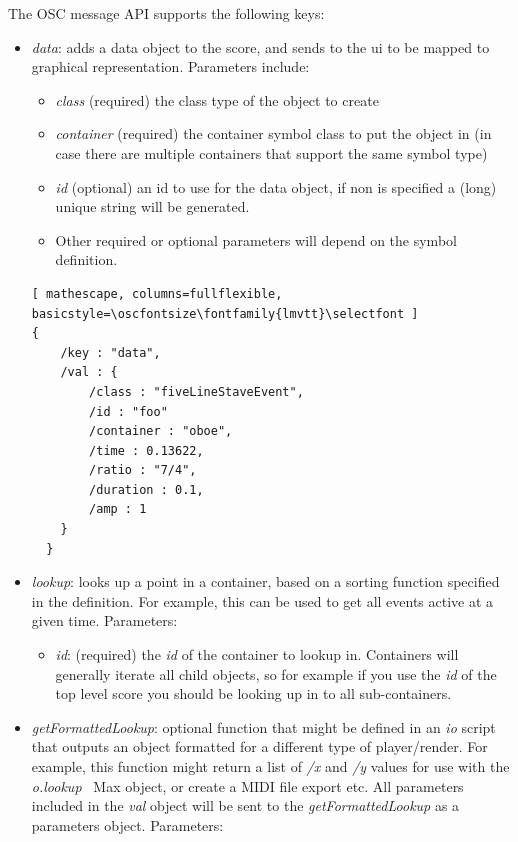 \documentclass{article}
\def\oscfontsize{\footnotesize}
\begin{document}
The OSC message API supports the following keys:
\begin{itemize}\itemsep0pt 
\item \textit{data}: adds a data object to the score, and sends to the ui to be mapped to graphical representation. Parameters include:
\begin{itemize}\itemsep0pt 
  \item \textit{class} (required) the class type of the object to create
  \item \textit{container} (required) the container symbol class to put the object in (in case there are multiple containers that support the same symbol type)
  \item \textit{id} (optional) an id to use for the data object, if non is specified a (long) unique string will be generated.
  \item Other required or optional parameters will depend on the symbol definition.
\end{itemize}

\begin{lstlisting}[ mathescape, columns=fullflexible, basicstyle=\oscfontsize\fontfamily{lmvtt}\selectfont ]
{
    /key : "data",
    /val : {
        /class : "fiveLineStaveEvent",
        /id : "foo"
        /container : "oboe",
        /time : 0.13622,
        /ratio : "7/4",
        /duration : 0.1,
        /amp : 1
    }
  }
\end{lstlisting}


\item \textit{lookup}: looks up a point in a container, based on a sorting function specified in the definition. For example, this can be used to get all events active at a given time. Parameters:

\begin{itemize}\itemsep0pt 
  \item \textit{id}: (required) the \textit{id} of the container to lookup in. Containers will generally iterate all child objects, so for example if you use the \textit{id} of the top level score you should be looking up in to all sub-containers.
  \end{itemize}
  
\item \textit{getFormattedLookup}: optional function that might be defined in an \textit{io} script that outputs an object formatted for a different type of player/render. For example, this function might return a list of \textit{/x} and \textit{/y} values for use with the \textit{o.lookup~} Max object, or create a MIDI file export etc. All parameters included in the \textit{val} object will be sent to the \textit{getFormattedLookup} as a parameters object. Parameters:


\end{itemize}
\end{document}
